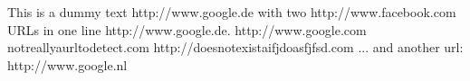 This is a dummy text http://www.google.de with two http://www.facebook.com
URLs in one line http://www.google.de.
http://www.google.com
notreallyaurltodetect.com
http://doesnotexistaifjdoasfjfsd.com
... and another url: http://www.google.nl
